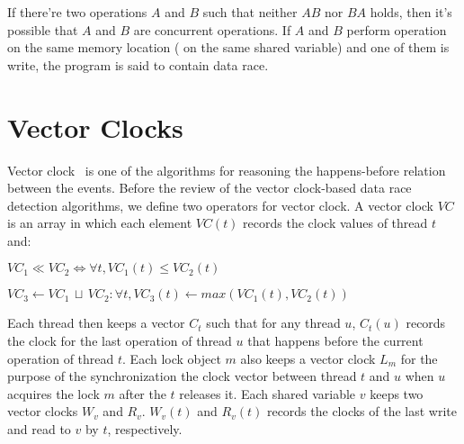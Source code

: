 If there're two operations $A$ and $B$ such that neither $A$\hb{}$B$ nor $B$\hb{}$A$ holds, then it's possible that $A$ and $B$ are concurrent operations. If $A$ and $B$ perform operation on the same memory location (\eg{} on the same shared variable) and one of them is write, the program is said to contain data race.

\section{Vector Clocks}
\label{s:DJIT+}
Vector clock~\cite{Mattern:1988p817} is one of the algorithms for reasoning the happens-before relation between the events. Before the review of the vector clock-based data race detection algorithms, we define two operators for vector clock. A vector clock $VC$ is an array in which each element $VC(t)$ records the clock values of thread $t$ and:
\begin{definition-box}
	\item $VC_1 \ll VC_2 \iff \forall t, VC_1(t) \le VC_2(t)$
	\item $VC_3 \gets VC_1\,\sqcup\,VC_2: \forall t, VC_3(t) \gets max(VC_1(t), VC_2(t))$
\end{definition-box}

Each thread then keeps a vector $C_t$ such that for any thread $u$, $C_t(u)$ records the clock for the last operation of thread $u$ that happens before the current operation of thread $t$. Each lock object $m$ also keeps a vector clock $L_m$ for the purpose of the synchronization the clock vector between thread $t$ and $u$ when $u$ acquires the lock $m$ after the $t$ releases it. Each shared variable $v$ keeps two vector clocks $W_v$ and $R_v$. $W_v(t)$ and $R_v(t)$ records the clocks of the last write and read to $v$ by $t$, respectively.

